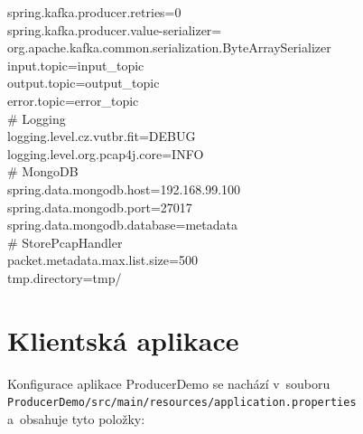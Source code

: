 {spring.kafka.producer.retries=0 \\
spring.kafka.producer.value-serializer= \\
\indent org.apache.kafka.common.serialization.ByteArraySerializer \\
input.topic=input\_topic \\
output.topic=output\_topic \\
error.topic=error\_topic \\
\#   Logging \\
logging.level.cz.vutbr.fit=DEBUG \\
logging.level.org.pcap4j.core=INFO \\
\#   MongoDB \\
spring.data.mongodb.host=192.168.99.100 \\
spring.data.mongodb.port=27017 \\
spring.data.mongodb.database=metadata \\
\#   StorePcapHandler \\
packet.metadata.max.list.size=500 \\
tmp.directory=tmp/
}

\section{Klientská aplikace}
Konfigurace aplikace ProducerDemo se nachází v~souboru \\
\texttt{ProducerDemo/src/main/resources/application.properties} \\
a~obsahuje tyto položky:

